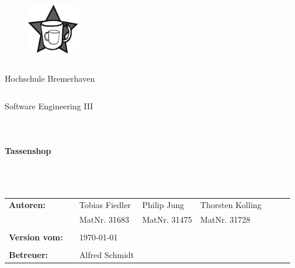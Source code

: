
\thispagestyle{empty}
\begin{figure}[t]
 \centering
 \includegraphics[width=0.2\textwidth]{mug}
\end{figure}

\begin{verbatim}
\end{verbatim}

\begin{center}
\Huge{Hochschule Bremerhaven}
\end{center}

\begin{verbatim}
\end{verbatim}

\begin{center}
\huge{Software Engineering III}
\end{center}

\begin{verbatim}
\end{verbatim}
\begin{verbatim}
\end{verbatim}
\begin{verbatim}
\end{verbatim}

\begin{center}
\textbf{\LARGE{Tassenshop}}\\
\end{center}

\begin{verbatim}
\end{verbatim}
\begin{verbatim}
\end{verbatim}
\begin{verbatim}
\end{verbatim}
\begin{verbatim}
\end{verbatim}

\begin{flushleft}
\begin{tabular}{llllllll}
\textbf{Autoren:}     & & Tobias Fiedler & Philip Jung  & Thorsten Kolling &  \\
                      & & MatNr. 31683   & MatNr. 31475 & MatNr. 31728     &  \\
                      & & \\
\textbf{Version vom:} & & \today &\\
                      & & \\
\textbf{Betreuer:}    & & Alfred Schmidt &\\
\end{tabular}
\end{flushleft}
